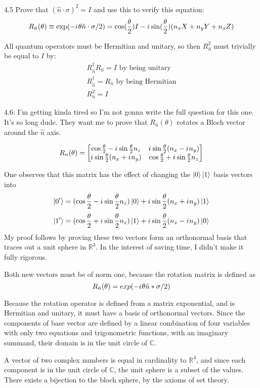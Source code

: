 \documentclass[12pt, letterpaper, twoside]{article}
\newcommand{\iu}{{i\mkern1mu}}
\newcommand{\halftheta}{\frac{\theta}{2}}
\newcommand{\twoXtwo}[4]{\begin{bmatrix}
    #1 & #3 \\
    #2 & #4
\end{bmatrix}}
\newcommand{\Rn}{\twoXtwo{
    \cos{\halftheta} - \iu \sin{\halftheta}n_z
    }{
        \iu \sin{\halftheta}(n_x + \iu n_y)
    }{
        \iu \sin{\halftheta}(n_x - \iu n_y)
    }{
        \cos{\halftheta} + \iu \sin{\halftheta}n_z
        }}
\begin{document}
4.5 Prove that $(\hat{n} \cdot \sigma)^2 = I$ and use this to verify this equation:
$$
	R_{\hat{n}}(\theta) \equiv \exp(-\iu \theta \hat{n} \cdot \sigma/2) = \cos(\frac{\theta}{2})I - \iu \sin(\frac{\theta}{2})(n_xX + n_yY + n_zZ)
$$

All quantum operators must be Hermitian and unitary, so then $R_{\hat{n}}^2$ must trivially be equal to $I$ by:
\begin{subequations}
	\begin{align}
R_{\hat{n}}^\dagger R_{\hat{n}} = I \text{ by being unitary} \\
R_{\hat{n}}^\dagger = R_{\hat{n}} \text{ by being Hermitian} \\
R_{\hat{n}}^2 = I
\end{align}
\end{subequations}

4.6: I'm getting kinda tired so I'm not gonna write the full question for this one. It's so long dude. They want me to prove that $R_{\hat{n}}(\theta)$ rotates a Bloch vector around the $\hat{n}$ axis.

$$
R_n(\theta) = \Rn
$$

One observes that this matrix has the effect of changing the $\ket{0}\ket{1}$ basis vectors into
$$
\ket{0'} = (\cos{\halftheta} - \iu \sin{\halftheta}n_z)\ket{0} + \iu\sin{\halftheta}(n_x + \iu n_y) \ket{1}
$$
$$
\ket{1'} = (\cos{\halftheta} + \iu \sin{\halftheta}n_z)\ket{1} +  \iu\sin{\halftheta}(n_x - \iu n_y) \ket{0}
$$
My proof follows by proving these two vectors form an orthonormal basis that traces out a unit sphere in $\mathbb{R}^3$. In the interest of saving time, I didn't make it fully rigorous.

Both new vectors must be of norm one, because the rotation matrix is defined as
$$
R_{\hat{n}}(\theta) = exp(-\iu \theta \hat{n} * \sigma/2)
$$

Because the rotation operator is defined from a matrix exponential, and is Hermitian and unitary, it must have a basis of orthonormal vectors. Since the components of base vector are defined by a linear combination of four variables with only two equations and trigonometric functions, with an imaginary summand, their domain is in the unit circle of $\mathbb{C}$.

A vector of two complex numbers is equal in cardinality to $\mathbb{R}^4$, and since each component is in the unit circle of $\mathbb{C}$, the unit sphere is a subset of the values. There exists a bijection to the bloch sphere, by the axioms of set theory.
\end{document}
